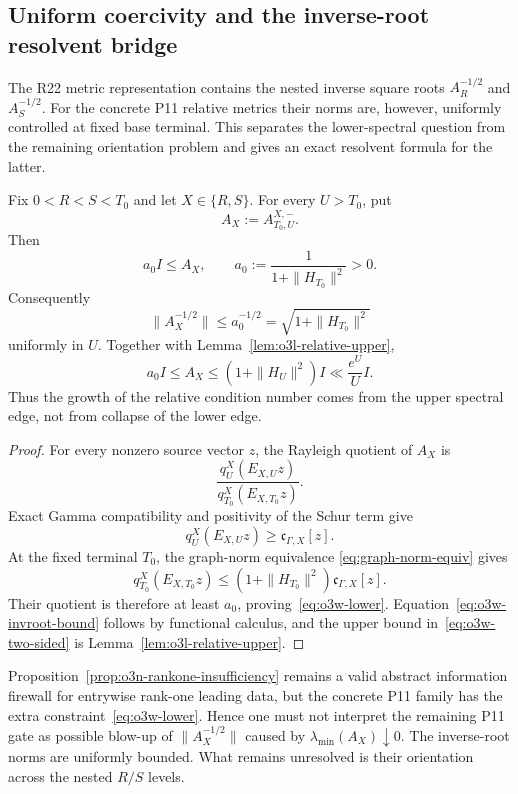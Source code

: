 
\subsection{Uniform coercivity and the inverse-root resolvent bridge}
\label{subsec:o3w-resolvent-bridge}

The R22 metric representation contains the nested inverse square roots
$A_R^{-1/2}$ and $A_S^{-1/2}$.  For the concrete P11 relative metrics their norms are,
however, uniformly controlled at fixed base terminal.  This separates the lower-spectral
question from the remaining orientation problem and gives an exact resolvent formula for
the latter.

\begin{proposition}
\label{prop:o3w-coercivity}
Fix $0<R<S<T_0$ and let $X\in\{R,S\}$.  For every $U>T_0$, put
\[
 A_X:=A_{T_0,U}^{X,-}.
\]
Then
\[
 \boxed{
 a_0 I\le A_X,
 \qquad
 a_0:=\frac1{1+\|H_{T_0}\|^2}>0.
 }
\tag{O3W.1}\label{eq:o3w-lower}
\]
Consequently
\[
 \boxed{
 \|A_X^{-1/2}\|
 \le a_0^{-1/2}
 =\sqrt{1+\|H_{T_0}\|^2}
 }
\tag{O3W.2}\label{eq:o3w-invroot-bound}
\]
uniformly in $U$.
Together with Lemma~\ref{lem:o3l-relative-upper},
\[
 a_0I\le A_X\le(1+\|H_U\|^2)I
 \ll\frac{e^U}{U}I.
\tag{O3W.3}\label{eq:o3w-two-sided}
\]
Thus the growth of the relative condition number comes from the upper spectral edge,
not from collapse of the lower edge.
\end{proposition}

\begin{proof}
For every nonzero source vector $z$, the Rayleigh quotient of $A_X$ is
\[
 \frac{q_U^X(E_{X,U}z)}{q_{T_0}^X(E_{X,T_0}z)}.
\]
Exact Gamma compatibility and positivity of the Schur term give
\[
 q_U^X(E_{X,U}z)\ge\mathfrak c_{\Gamma,X}[z].
\]
At the fixed terminal $T_0$, the graph-norm equivalence
\eqref{eq:graph-norm-equiv} gives
\[
 q_{T_0}^X(E_{X,T_0}z)
 \le(1+\|H_{T_0}\|^2)\mathfrak c_{\Gamma,X}[z].
\]
Their quotient is therefore at least $a_0$, proving~\eqref{eq:o3w-lower}.
Equation~\eqref{eq:o3w-invroot-bound} follows by functional calculus, and the upper
bound in~\eqref{eq:o3w-two-sided} is Lemma~\ref{lem:o3l-relative-upper}.
\end{proof}

\begin{remark}
\label{rem:o3w-concrete-firewall}
Proposition~\ref{prop:o3n-rankone-insufficiency} remains a valid abstract information
firewall for entrywise rank-one leading data, but the concrete P11 family has the extra
constraint~\eqref{eq:o3w-lower}.  Hence one must not interpret the remaining P11 gate as
possible blow-up of $\|A_X^{-1/2}\|$ caused by
$\lambda_{\min}(A_X)\downarrow0$.  The inverse-root norms are uniformly bounded.  What
remains unresolved is their orientation across the nested $R/S$ levels.
\end{remark}

